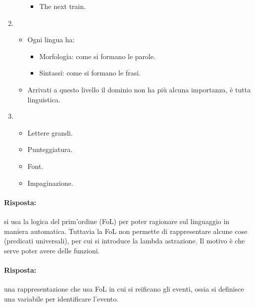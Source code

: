 \begin{enumerate}
\begin{itemize}
\begin{itemize}
          \item The next train.
        \end{itemize}
    \end{itemize}
  \item {}
    \begin{itemize}
      \item Ogni lingua ha: 
        \begin{itemize}
          \item Morfologia: come si formano le parole. 
          \item Sintassi: come si formano le frasi.
        \end{itemize}
      \item Arrivati a questo livello il dominio non ha più alcuna importanza, è tutta linguistica.
    \end{itemize}
  \item {} 
    \begin{itemize}
      \item Lettere grandi. 
      \item Punteggiatura. 
      \item Font. 
      \item Impaginazione.
    \end{itemize}
\end{enumerate}



\paragraph{Risposta:} si usa la logica del prim'ordine (FoL) per poter ragionare sul linguaggio in maniera automatica. Tuttavia la FoL non permette di rappresentare alcune cose (predicati universali), per cui si introduce la lambda astrazione. Il motivo è che serve poter avere delle funzioni.



\paragraph{Risposta:} una rappresentazione che usa FoL in cui si reificano gli eventi, ossia si definisce una variabile per identificare l'evento.

